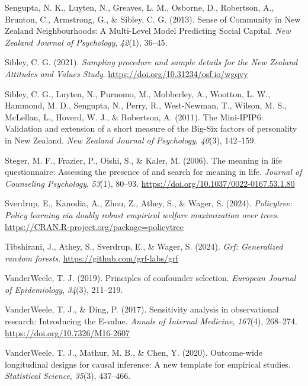 \documentclass[
  single column]{article}
\newlength{\cslhangindent}
\newenvironment{CSLReferences}[2] %
 {\begin{list}{}{%
  \setlength{\itemindent}{0pt}
  \setlength{\leftmargin}{0pt}
  \setlength{\parsep}{0pt}
  \ifodd #1
   \setlength{\leftmargin}{\cslhangindent}
   \setlength{\itemindent}{-1\cslhangindent}
  \fi
  \setlength{\itemsep}{#2\baselineskip}}}
 {\end{list}}
\begin{document}
\begin{CSLReferences}{1}{0}
Sengupta, N. K., Luyten, N., Greaves, L. M., Osborne, D., Robertson, A.,
Brunton, C., Armstrong, G., \& Sibley, C. G. (2013). Sense of Community
in {N}ew {Z}ealand Neighbourhoods: A Multi-Level Model Predicting Social
Capital. \emph{New Zealand Journal of Psychology}, \emph{42}(1), 36--45.

Sibley, C. G. (2021). \emph{Sampling procedure and sample details for
the {N}ew {Z}ealand {A}ttitudes and {V}alues {S}tudy}.
\url{https://doi.org/10.31234/osf.io/wgqvy}

Sibley, C. G., Luyten, N., Purnomo, M., Mobberley, A., Wootton, L. W.,
Hammond, M. D., Sengupta, N., Perry, R., West-Newman, T., Wilson, M. S.,
McLellan, L., Hoverd, W. J., \& Robertson, A. (2011). The Mini-IPIP6:
Validation and extension of a short measure of the Big-Six factors of
personality in {N}ew {Z}ealand. \emph{New Zealand Journal of
Psychology}, \emph{40}(3), 142--159.

Steger, M. F., Frazier, P., Oishi, S., \& Kaler, M. (2006). The meaning
in life questionnaire: Assessing the presence of and search for meaning
in life. \emph{Journal of Counseling Psychology}, \emph{53}(1), 80--93.
\url{https://doi.org/10.1037/0022-0167.53.1.80}

Sverdrup, E., Kanodia, A., Zhou, Z., Athey, S., \& Wager, S. (2024).
\emph{Policytree: Policy learning via doubly robust empirical welfare
maximization over trees}.
\url{https://CRAN.R-project.org/package=policytree}

Tibshirani, J., Athey, S., Sverdrup, E., \& Wager, S. (2024). \emph{Grf:
Generalized random forests}. \url{https://github.com/grf-labs/grf}

VanderWeele, T. J. (2019). Principles of confounder selection.
\emph{European Journal of Epidemiology}, \emph{34}(3), 211--219.

VanderWeele, T. J., \& Ding, P. (2017). Sensitivity analysis in
observational research: Introducing the {E}-value. \emph{Annals of
Internal Medicine}, \emph{167}(4), 268--274.
\url{https://doi.org/10.7326/M16-2607}

VanderWeele, T. J., Mathur, M. B., \& Chen, Y. (2020). Outcome-wide
longitudinal designs for causal inference: A new template for empirical
studies. \emph{Statistical Science}, \emph{35}(3), 437--466.


\end{CSLReferences}
\end{document}
